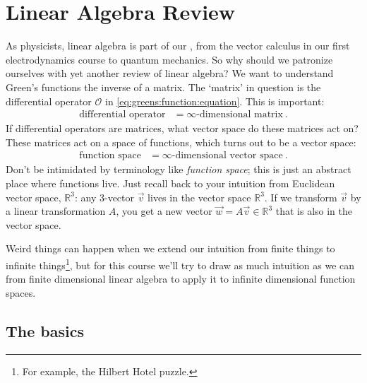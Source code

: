 
\section{Linear Algebra Review}

As physicists, linear algebra is part of our , from the vector calculus in our first electrodynamics course to quantum mechanics. So why should we patronize ourselves with yet another review of linear algebra?
%
We want to understand Green’s functions the inverse of a matrix. The `matrix' in question is the differential operator $\mathcal O$ in \eqref{eq:greens:function:equation}.
%
This is important:
\begin{align}
	\text{differential operator}
	&=
	\infty\text{-dimensional matrix} \ .
\end{align}
If differential operators are matrices, what vector space do these matrices act on? These matrices act on a space of functions, which turns out to be a vector space:
\begin{align}
  \text{function space} &= \infty\text{-dimensional vector space} \ .
\end{align}
Don't be intimidated by terminology like \emph{function space}; this is just an abstract place where functions live. Just recall back to your intuition from  Euclidean vector space, $\mathbb{R}^3$: any 3-vector $\vec{v}$ lives in the vector space $\mathbb{R}^3$. If we transform $\vec{v}$ by a linear transformation ${A}$, you get a new vector  $\vec{w} = {A}\vec{v} \in \mathbb{R}^3$ that is also in the vector space.

%
Weird things can happen when we extend our intuition from finite things to infinite things\footnote{For example, the Hilbert Hotel puzzle.}, but for this course we'll try to draw as much intuition as we can from finite dimensional linear algebra to apply it to infinite dimensional function spaces.

\subsection{The basics}


